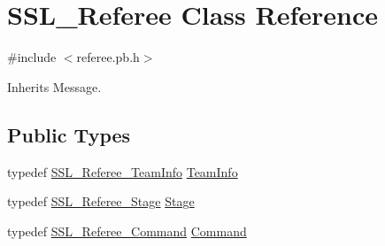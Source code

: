 \hypertarget{class_s_s_l___referee}{\section{S\-S\-L\-\_\-\-Referee Class Reference}
\label{class_s_s_l___referee}
}


{\ttfamily \#include $<$referee.\-pb.\-h$>$}



Inherits Message.

\subsection*{Public Types}
\begin{DoxyCompactItemize}
\item 
typedef \hyperlink{class_s_s_l___referee___team_info}{S\-S\-L\-\_\-\-Referee\-\_\-\-Team\-Info} \hyperlink{class_s_s_l___referee_a01148d808d7dee6dd11639203927d12d}{Team\-Info}
\item 
typedef \hyperlink{referee_8pb_8h_a38b80041d0259d508796c1bc7ab57c4c}{S\-S\-L\-\_\-\-Referee\-\_\-\-Stage} \hyperlink{class_s_s_l___referee_a59972df3405e56094caef252c884c080}{Stage}
\item 
typedef \hyperlink{referee_8pb_8h_a25bd5aba081a4c85e54d6ed275358d79}{S\-S\-L\-\_\-\-Referee\-\_\-\-Command} \hyperlink{class_s_s_l___referee_a5fc40f6f22c27ff90b91191567e36735}{Command}
\end{DoxyCompactItemize}
